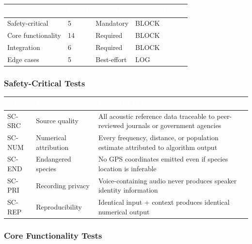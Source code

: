 \documentclass[11pt,letterpaper]{article}
\newcommand{\tableheader}[1]{\textbf{\sffamily\textcolor{white}{#1}}}
\begin{document}
\begin{center}
\begin{tabularx}{\textwidth}{L{3cm}C{1.5cm}C{2cm}C{2cm}}
\toprule
{}
\tableheader{Category} & \tableheader{Count} & \tableheader{Priority} & \tableheader{Failure Action} \\
\midrule
Safety-critical & 5 & Mandatory & BLOCK \\
Core functionality & 14 & Required & BLOCK \\
Integration & 6 & Required & BLOCK \\
Edge cases & 5 & Best-effort & LOG \\
\bottomrule
\end{tabularx}
\end{center}

\subsubsection{Safety-Critical Tests}

\begin{center}
\begin{tabularx}{\textwidth}{C{1.2cm}L{4cm}X}
\toprule
{}
\tableheader{ID} & \tableheader{Verifies} & \tableheader{Expected Behavior} \\
\midrule
SC-SRC & Source quality & All acoustic reference data traceable to peer-reviewed journals or government agencies \\
SC-NUM & Numerical attribution & Every frequency, distance, or population estimate attributed to algorithm output \\
SC-END & Endangered species & No GPS coordinates emitted even if species location is inferable \\
SC-PRI & Recording privacy & Voice-containing audio never produces speaker identity information \\
SC-REP & Reproducibility & Identical input + context produces identical numerical output \\
\bottomrule
\end{tabularx}
\end{center}

\subsubsection{Core Functionality Tests}
\end{document}
